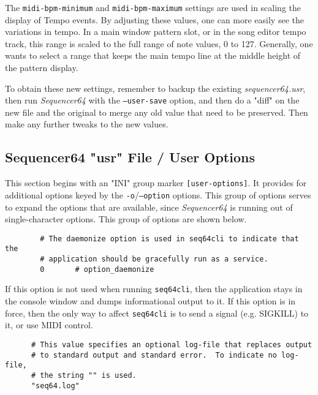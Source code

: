 		The \texttt{midi-bpm-minimum} and \texttt{midi-bpm-maximum} settings
		are used in scaling the display of Tempo events.
      By adjusting these values, one can more easily see the variations in
      tempo.  In a main window pattern slot, or in the song editor tempo track,
      this range is scaled to the full range of note values, 0 to 127.
      Generally, one wants to select a range that keeps the main tempo line at
      the middle height of the pattern display.

   To obtain these new settings, remember to backup the existing
   \textsl{sequencer64.usr}, then run \textsl{Sequencer64} with the
   \texttt{--user-save} option, and then do a "diff" on the new file and the
   original to merge any old value that need to be preserved.  Then make any
   further tweaks to the new values.

\subsection{Sequencer64 "usr" File / User Options}
\label{subsec:seq64_usr_file_user_options}

   This section begins with an
   "INI" group marker \texttt{[user-options]}.
   It provides for additional options keyed by the
   \texttt{-o}/\texttt{--option} options.
   This group of options serves to expand the options that are available, since
   \textsl{Sequencer64} is  running out of single-character options.
   This group of options are shown below.

   \begin{verbatim}
		# The daemonize option is used in seq64cli to indicate that the
		# application should be gracefully run as a service.
		0       # option_daemonize
   \end{verbatim}

   If this option is not used when running \texttt{seq64cli}, then the
   application stays in the console window and dumps informational output to
   it.  If this option is in force, then the only way to affect
   \texttt{seq64cli} is to send a signal (e.g. SIGKILL) to it, or use
   MIDI control.

   \begin{verbatim}
      # This value specifies an optional log-file that replaces output
      # to standard output and standard error.  To indicate no log-file,
      # the string "" is used.
      "seq64.log"
   \end{verbatim}

